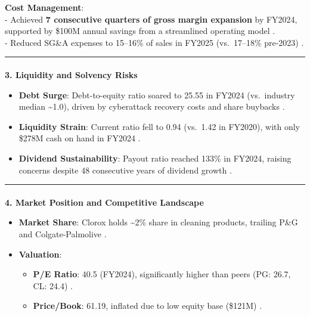 \documentclass[
  letterpaper,
  DIV=11,
  numbers=noendperiod]{scrartcl}
\makeatletter
\let\oldparagraph\paragraph
\renewcommand{\paragraph}{
    \@ifstar
      \xxxParagraphStar
      \xxxParagraphNoStar
  }
\newcommand{\xxxParagraphStar}[1]{\oldparagraph*{#1}\mbox{}}
\newcommand{\xxxParagraphNoStar}[1]{\oldparagraph{#1}\mbox{}}
\providecommand{\tightlist}{%
  \setlength{\itemsep}{0pt}\setlength{\parskip}{0pt}}\usepackage{longtable,booktabs,array}
\makeatother
\begin{document}
\textbf{Cost Management}:\\
- Achieved \textbf{7 consecutive quarters of gross margin expansion} by
FY2024, supported by \$100M annual savings from a streamlined operating
model .\\
- Reduced SG\&A expenses to 15--16\% of sales in FY2025 (vs.~17--18\%
pre-2023) .

\begin{center}\rule{0.5\linewidth}{0.5pt}\end{center}

\paragraph{\texorpdfstring{\textbf{3. Liquidity and Solvency
Risks}}{3. Liquidity and Solvency Risks}}\label{liquidity-and-solvency-risks}

\begin{itemize}
\tightlist
\item
  \textbf{Debt Surge}: Debt-to-equity ratio soared to 25.55 in FY2024
  (vs.~industry median \textasciitilde1.0), driven by cyberattack
  recovery costs and share buybacks .\\
\item
  \textbf{Liquidity Strain}: Current ratio fell to 0.94 (vs.~1.42 in
  FY2020), with only \$278M cash on hand in FY2024 .\\
\item
  \textbf{Dividend Sustainability}: Payout ratio reached 133\% in
  FY2024, raising concerns despite 48 consecutive years of dividend
  growth .
\end{itemize}

\begin{center}\rule{0.5\linewidth}{0.5pt}\end{center}

\paragraph{\texorpdfstring{\textbf{4. Market Position and Competitive
Landscape}}{4. Market Position and Competitive Landscape}}\label{market-position-and-competitive-landscape}

\begin{itemize}
\tightlist
\item
  \textbf{Market Share}: Clorox holds \textasciitilde2\% share in
  cleaning products, trailing P\&G and Colgate-Palmolive .\\
\item
  \textbf{Valuation}:

  \begin{itemize}
  \tightlist
  \item
    \textbf{P/E Ratio}: 40.5 (FY2024), significantly higher than peers
    (PG: 26.7, CL: 24.4) .\\
  \item
    \textbf{Price/Book}: 61.19, inflated due to low equity base (\$121M)
    .
  \end{itemize}
\end{itemize}
\end{document}
